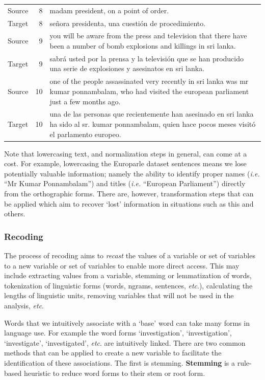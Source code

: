 \documentclass[
  letterpaper,
]{latex/krantz}
\begin{document}
\begin{table}
\begin{tabular}{lrl}
Source & 8 & madam president, on a point of order.\\
Target & 8 & señora presidenta, una cuestión de procedimiento.\\
Source & 9 & you will be aware from the press and television that there have been a number of bomb explosions and killings in sri lanka.\\
Target & 9 & sabrá usted por la prensa y la televisión que se han producido una serie de explosiones y asesinatos en sri lanka.\\
Source & 10 & one of the people assassinated very recently in sri lanka was mr kumar ponnambalam, who had visited the european parliament just a few months ago.\\
\addlinespace
Target & 10 & una de las personas que recientemente han asesinado en sri lanka ha sido al sr. kumar ponnambalam, quien hace pocos meses visitó el parlamento europeo.\\
\bottomrule
\end{tabular}
\end{table}

Note that lowercasing text, and normalization steps in general, can come
at a cost. For example, lowercasing the Europarle dataset sentences
means we lose potentially valuable information; namely the ability to
identify proper names (\emph{i.e.} ``Mr Kumar Ponnambalam'') and titles
(\emph{i.e.} ``European Parliament'') directly from the orthographic
forms. There are, however, transformation steps that can be applied
which aim to recover `lost' information in situations such as this and
others.

\hypertarget{recoding}{%
\subsubsection{Recoding}\label{recoding}}

The process of recoding aims to \emph{recast} the values of a variable
or set of variables to a new variable or set of variables to enable more
direct access. This may include extracting values from a variable,
stemming or lemmatization of words, tokenization of linguistic forms
(words, ngrams, sentences, \emph{etc}.), calculating the lengths of
linguistic units, removing variables that will not be used in the
analysis, \emph{etc}.

Words that we intuitively associate with a `base' word can take many
forms in language use. For example the word forms `investigation',
`investigation', `investigate', `investigated', \emph{etc}. are
intuitively linked. There are two common methods that can be applied to
create a new variable to facilitate the identification of these
associations. The first is stemming. \textbf{Stemming} is a rule-based
heuristic to reduce word forms to their stem or root form.
\end{document}
